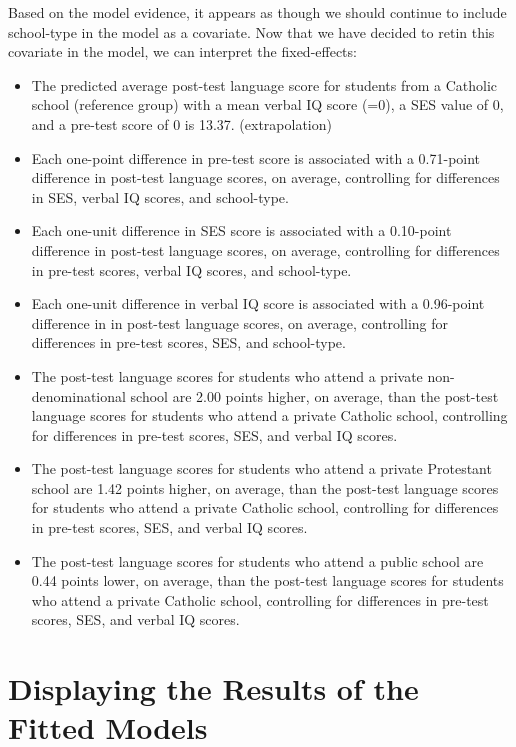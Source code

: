 \documentclass[]{book}
\providecommand{\tightlist}{%
  \setlength{\itemsep}{0pt}\setlength{\parskip}{0pt}}
\begin{document}
Based on the model evidence, it appears as though we should continue to include school-type in the model as a covariate. Now that we have decided to retin this covariate in the model, we can interpret the fixed-effects:

\begin{itemize}
\tightlist
\item
  The predicted average post-test language score for students from a Catholic school (reference group) with a mean verbal IQ score (=0), a SES value of 0, and a pre-test score of 0 is 13.37. (extrapolation)
\item
  Each one-point difference in pre-test score is associated with a 0.71-point difference in post-test language scores, on average, controlling for differences in SES, verbal IQ scores, and school-type.
\item
  Each one-unit difference in SES score is associated with a 0.10-point difference in post-test language scores, on average, controlling for differences in pre-test scores, verbal IQ scores, and school-type.
\item
  Each one-unit difference in verbal IQ score is associated with a 0.96-point difference in in post-test language scores, on average, controlling for differences in pre-test scores, SES, and school-type.
\item
  The post-test language scores for students who attend a private non-denominational school are 2.00 points higher, on average, than the post-test language scores for students who attend a private Catholic school, controlling for differences in pre-test scores, SES, and verbal IQ scores.
\item
  The post-test language scores for students who attend a private Protestant school are 1.42 points higher, on average, than the post-test language scores for students who attend a private Catholic school, controlling for differences in pre-test scores, SES, and verbal IQ scores.
\item
  The post-test language scores for students who attend a public school are 0.44 points lower, on average, than the post-test language scores for students who attend a private Catholic school, controlling for differences in pre-test scores, SES, and verbal IQ scores.
\end{itemize}

\hypertarget{displaying-the-results-of-the-fitted-models}{%
\section{Displaying the Results of the Fitted Models}\label{displaying-the-results-of-the-fitted-models}}
\end{document}
